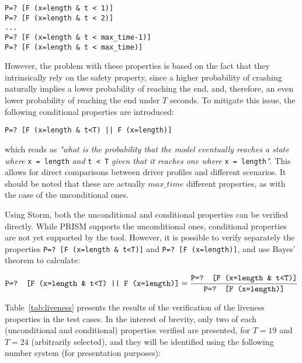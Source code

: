 \begin{minipage}{\linewidth}
{\vspace{1em}
\begin{lstlisting}
P=? [F (x=length & t < 1)]
P=? [F (x=length & t < 2)]
...
P=? [F (x=length & t < max_time-1)]
P=? [F (x=length & t < max_time)]
\end{lstlisting}
}
\end{minipage}

However, the problem with these properties is based on the fact that they intrinsically rely on the safety property, since a higher probability of crashing naturally implies a lower probability of reaching the end, and, therefore, an even lower probability of reaching the end under $T$ seconds. To mitigate this issue, the following conditional properties are introduced:

\begin{minipage}{\linewidth}
{\vspace{1em}
\begin{lstlisting}
P=? [F (x=length & t<T) || F (x=length)]
\end{lstlisting}
}
\end{minipage}

which reads as \textit{"what is the probability that the model eventually reaches a state where }\texttt{x = length}\textit{ and }\texttt{t < T}\textit{ given that it reaches one where} \texttt{x = length}\textit{"}. This allows for direct comparisons between driver profiles and different scenarios. It should be noted that these are actually $max\_time$ different properties, as with the case of the unconditional ones. 

Using Storm, both the unconditional and conditional properties can be verified directly. While PRISM supports the unconditional ones, conditional properties are not yet supported by the tool. However, it is possible to verify separately the properties \texttt{P=? [F (x=length \& t<T)]} and \texttt{P=? [F (x=length)]}, and use Bayes' theorem to calculate:

\begin{equation}
\text{\texttt{P=? [F (x=length \& t<T) || F (x=length)]}} = \frac{\text{\texttt{P=? [F (x=length \& t<T)]}}}{\text{\texttt{P=? [F (x=length)]}}}
\end{equation}

Table~\ref{tab:liveness} presents the results of the verification of the liveness properties in the test cases. In the interest of brevity, only two of each (unconditional and conditional) properties verified are presented, for $T = 19$ and $T = 24$ (arbitrarily selected), and they will be identified using the following number system (for presentation purposes):

